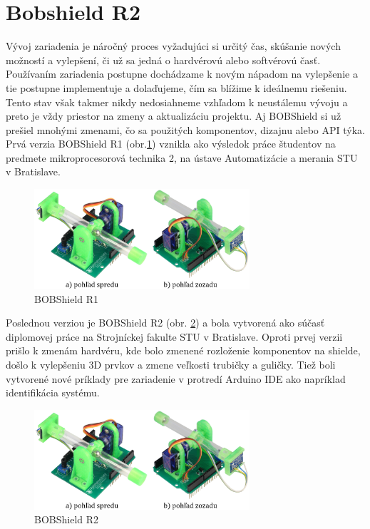 \section{Bobshield R2}
\label{kap:1.3}
Vývoj zariadenia je náročný proces vyžadujúci si určitý čas, skúšanie nových možností a vylepšení, či už sa jedná o hardvérovú alebo softvérovú časť. Používaním zariadenia postupne dochádzame k novým nápadom na vylepšenie a tie postupne implementuje a dolaďujeme, čím sa blížime k ideálnemu riešeniu. Tento stav však takmer nikdy nedosiahneme vzhľadom k neustálemu vývoju a preto je vždy priestor na zmeny a aktualizáciu projektu. Aj BOBShield si už prešiel mnohými zmenami, čo sa použitých komponentov, dizajnu alebo API  týka. Prvá verzia BOBShield R1 (obr.\ref{OBRAZOK 1.3})  vznikla ako výsledok práce študentov na predmete mikroprocesorová technika 2, na ústave Automatizácie a merania STU v Bratislave. 

\begin{figure}[h]
	\centering
	\includegraphics[width=80mm]{obr/R1.eps}
	\caption{BOBShield R1 \cite{Anicka}}\label{OBRAZOK 1.3} 
\end{figure} 

Poslednou verziou je BOBShield R2 (obr. \ref{OBRAZOK 1.4}) a bola vytvorená ako súčasť diplomovej práce na Strojníckej fakulte STU v Bratislave.  Oproti prvej verzii prišlo k zmenám hardvéru, kde bolo zmenené rozloženie komponentov na shielde, došlo k vylepšeniu 3D prvkov a zmene veľkosti trubičky a guličky. Tiež boli vytvorené nové príklady pre zariadenie v protredí Arduino IDE ako napríklad identifikácia systému. 

\begin{figure}[h]
	\centering
	\includegraphics[width=80mm]{obr/R1.eps}
	\caption{BOBShield R2 \cite{Anicka}}\label{OBRAZOK 1.4} 
\end{figure} 

